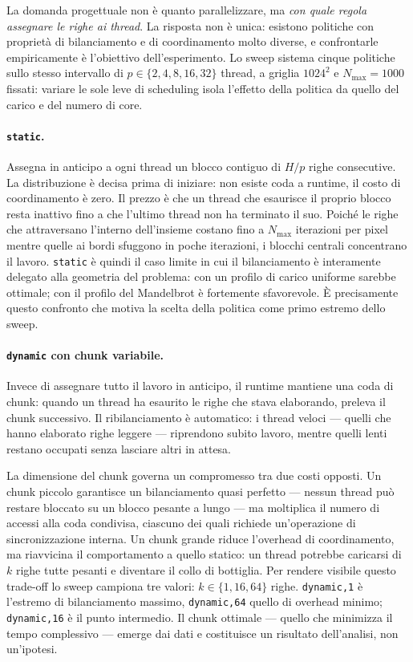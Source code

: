 La domanda progettuale non è quanto parallelizzare, ma \emph{con quale regola
assegnare le righe ai thread}. La risposta non è unica: esistono politiche con
proprietà di bilanciamento e di coordinamento molto diverse, e confrontarle
empiricamente è l'obiettivo dell'esperimento. Lo sweep sistema cinque politiche
sullo stesso intervallo di $p \in \{2, 4, 8, 16, 32\}$ thread, a griglia
$1024^2$ e $N_{\max} = 1000$ fissati: variare le sole leve di scheduling
isola l'effetto della politica da quello del carico e del numero di core.

\paragraph{\texttt{static}.}
Assegna in anticipo a ogni thread un blocco contiguo di $H/p$
righe consecutive. La distribuzione è decisa prima di iniziare: non esiste coda
a runtime, il costo di coordinamento è zero. Il prezzo è che un thread che
esaurisce il proprio blocco resta inattivo fino a che l'ultimo thread non ha
terminato il suo. Poiché le righe che attraversano l'interno dell'insieme
costano fino a $N_{\max}$ iterazioni per pixel mentre quelle ai bordi sfuggono
in poche iterazioni, i blocchi centrali concentrano il lavoro. \texttt{static}
è quindi il caso limite in cui il bilanciamento è interamente delegato alla
geometria del problema: con un profilo di carico uniforme sarebbe ottimale; con
il profilo del Mandelbrot è fortemente sfavorevole. È precisamente questo confronto che motiva la
scelta della politica come primo estremo dello sweep.

\paragraph{\texttt{dynamic} con chunk variabile.}
Invece di assegnare tutto il lavoro in anticipo, il runtime mantiene una coda
di chunk: quando un thread ha esaurito le righe che stava elaborando, preleva il
chunk successivo. Il ribilanciamento è automatico: i thread veloci --- quelli
che hanno elaborato righe leggere --- riprendono subito lavoro, mentre quelli
lenti restano occupati senza lasciare altri in attesa.

La dimensione del chunk governa un compromesso tra due costi opposti. Un chunk
piccolo garantisce un bilanciamento quasi perfetto --- nessun thread può restare
bloccato su un blocco pesante a lungo --- ma moltiplica il numero di accessi
alla coda condivisa, ciascuno dei quali richiede un'operazione di
sincronizzazione interna. Un chunk grande riduce l'overhead di coordinamento,
ma riavvicina il comportamento a quello statico: un thread potrebbe caricarsi di
$k$ righe tutte pesanti e diventare il collo di bottiglia. Per rendere visibile
questo trade-off lo sweep campiona tre valori: $k \in \{1, 16, 64\}$ righe.
\texttt{dynamic,1} è l'estremo di bilanciamento massimo, \texttt{dynamic,64}
quello di overhead minimo; \texttt{dynamic,16} è il punto intermedio. Il chunk
ottimale --- quello che minimizza il tempo complessivo --- emerge dai dati e
costituisce un risultato dell'analisi, non un'ipotesi.

